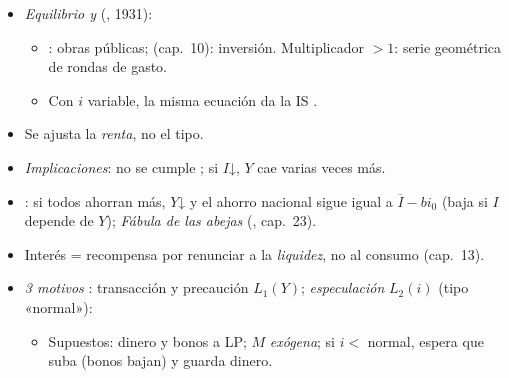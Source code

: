 \documentclass{article}
\begin{document}
\begin{columnas}
\begin{itemize}
\begin{itemize}
  \item EMgK: tipo de descuento que iguala rendimientos esperados y precio de oferta; se invierte hasta EMgK $=i$ ($b$ pequeño).
  \item \emph{Incertidumbre} (cap.~12): \emph{convenciones} («¿dónde va Vicente? Donde va la gente»); concurso de belleza.
  \item Si la convención se rompe, inversión inestable: , «impulso espontáneo a la acción».  (1937): la incertidumbre, mensaje central .
  \end{itemize}
\item \emph{Equilibrio y}  (, 1931):
  \begin{itemize}
  \item {}: obras públicas;  (cap.~10): inversión. Multiplicador $>1$: serie geométrica de rondas de gasto.
  \item Con $i$ variable, la misma ecuación da la IS .
  \end{itemize}
\end{itemize}
\begin{itemize}
\item Se ajusta la \emph{renta}, no el tipo.
\item \emph{Implicaciones}: no se cumple ; si $I$↓, $Y$ cae varias veces más.
\item {}: si todos ahorran más, $Y$↓ y el ahorro nacional sigue igual a $\overline I-bi_0$ (baja si $I$ depende de $Y$); \emph{Fábula de las abejas} (, cap.~23).
\end{itemize}
\begin{itemize}
\item Interés = recompensa por renunciar a la \emph{liquidez}, no al consumo (cap.~13).
\item \emph{3 motivos} : transacción y precaución $L_1(Y)$; \emph{especulación} $L_2(i)$ (tipo «normal»):
  \begin{itemize}
  \item Supuestos: dinero y bonos a LP; $M$ \emph{exógena}; si $i<$ normal, espera que suba (bonos bajan) y guarda dinero.

\end{itemize}
\end{itemize}
\end{columnas}
\end{document}
